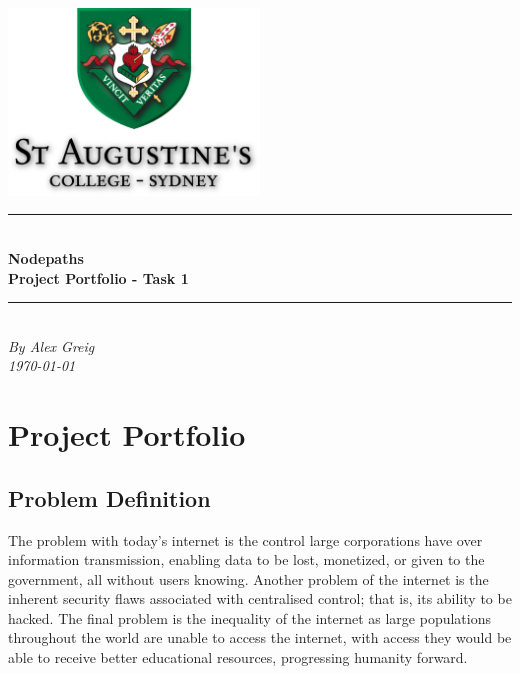 \documentclass[a4paper, titlepage]{article}
\begin{document}
\title{}
\author{Alex Greig}
\begin{titlepage}
	\centering
	\includegraphics[width=0.5\textwidth]{sta-logo.png}\par
	\vspace{1.5cm}
	\noindent\rule{12cm}{0.07cm} \\
	\vspace{0.2cm}
	{\huge{\textbf{Nodepaths\\Project Portfolio - Task 1}}\\}
	\vspace{0.2cm}
	\noindent\rule{12cm}{0.07cm} \\
	\vspace{1.5cm}
	{\LARGE{\emph{By Alex Greig}}} \\
	\vspace{1.5cm}
	{\large{\emph{ \today}}}
	\vfill
\end{titlepage}

\tableofcontents
\vfill
\section{Project Portfolio}

\subsection{Problem Definition}
The problem with today's internet is the control large corporations have over information transmission, enabling data to be lost, monetized, or given to the government, all without users knowing. Another problem of the internet is the inherent security flaws associated with centralised control; that is, its ability to be hacked. The final problem is the inequality of the internet as large populations throughout the world are unable to access the internet, with access they would be able to receive better educational resources, progressing humanity forward. \\
\end{document}
